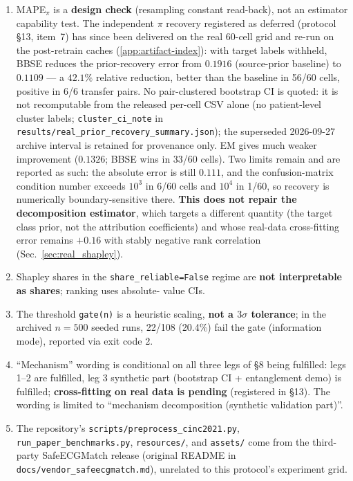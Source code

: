 \documentclass[review,12pt,nonatbib]{elsarticle}
\begin{document}
\begin{enumerate}
    \item MAPE$_\pi$ is a \textbf{design check} (resampling constant
    read-back), not an estimator capability test. The independent $\pi$
    recovery registered as deferred (protocol \S13, item~7) has since
    been delivered on the real 60-cell grid and re-run on the
    post-retrain caches
    (\ref{app:artifact-index}): with target labels withheld,
    BBSE reduces the prior-recovery error from $0.1916$ (source-prior
    baseline) to $0.1109$ --- a $42.1\%$ relative reduction, better than
    the baseline in 56/60 cells, positive in 6/6 transfer pairs. No
    pair-clustered bootstrap CI is quoted: it is not recomputable from
    the released per-cell CSV alone (no patient-level cluster labels;
    \texttt{cluster\_ci\_note} in
    \texttt{results/real\_prior\_recovery\_summary.json}); the superseded
    2026-09-27 archive interval is retained for provenance only.
    EM gives much
    weaker improvement ($0.1326$; BBSE wins in 33/60 cells). Two limits
    remain and are reported as such:
    the absolute error is still $0.111$, and the confusion-matrix
    condition number exceeds $10^3$ in 6/60 cells and $10^4$ in 1/60, so
    recovery is numerically boundary-sensitive there. \textbf{This does
    not repair the decomposition estimator}, which targets a different
    quantity (the target class prior, not the attribution coefficients)
    and whose real-data cross-fitting error remains $+0.16$ with stably
    negative rank correlation (Sec.~\ref{sec:real_shapley}).
    \item Shapley shares in the \texttt{share\_reliable=False} regime
    are \textbf{not interpretable as shares}; ranking uses absolute-
    value CIs.
    \item The threshold \texttt{gate(n)} is a heuristic scaling,
    \textbf{not a $3\sigma$ tolerance}; in the archived $n=500$
    seeded runs, 22/108 (20.4\%) fail the gate (information mode),
    reported via exit code 2.
    \item ``Mechanism'' wording is conditional on all three legs of
    \S8 being fulfilled: legs 1--2 are fulfilled, leg 3 synthetic part
    (bootstrap CI + entanglement demo) is fulfilled;
    \textbf{cross-fitting on real data is pending} (registered in
    \S13). The wording is limited to ``mechanism decomposition
    (synthetic validation part)''.
    \item The repository's \texttt{scripts/preprocess\_cinc2021.py},
    \texttt{run\_paper\_benchmarks.py}, \texttt{resources/}, and
    \texttt{assets/} come from the third-party SafeECGMatch release
    (original README in \texttt{docs/vendor\_safeecgmatch.md}),
    unrelated to this protocol's experiment grid.
\end{enumerate}
\end{document}

